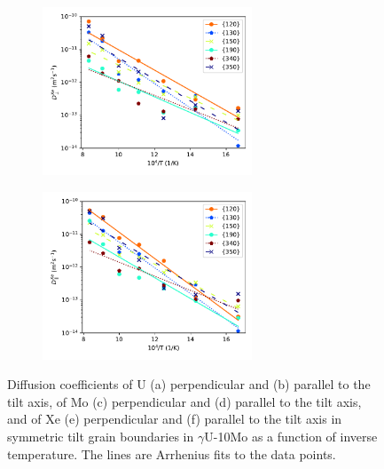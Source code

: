 \documentclass{elsarticle}
\providecommand{\DIFadd}[1]{{\protect\color{blue} \sf #1}} %
\providecommand{\DIFaddFL}[1]{\DIFadd{#1}} %
\providecommand{\DIFaddendFL}{} %
\begin{document}
\begin{figure}[!ht]
\begin{subfigure}{0.45\textwidth}
\end{subfigure}
\begin{subfigure}{0.45\textwidth}
	\centering
	\caption{}
	\includegraphics[height=5cm]{u10mo_Xe_Dx.pdf}
\end{subfigure}
\begin{subfigure}{0.45\textwidth}
	\centering
	\caption{}
	\includegraphics[height=5cm]{u10mo_Xe_Dz.pdf}
\end{subfigure}
\caption{\DIFaddFL{Diffusion coefficients of U (a) perpendicular and (b) parallel to the tilt axis, of Mo (c) perpendicular and (d) parallel to the tilt axis, and of Xe (e) perpendicular and (f) parallel to the tilt axis in symmetric tilt grain boundaries in $\gamma$U-10Mo as a function of inverse temperature. The lines are Arrhenius fits to the data points.}}
\DIFaddendFL \label{fig:u10mo}
\end{figure}
\end{document}
